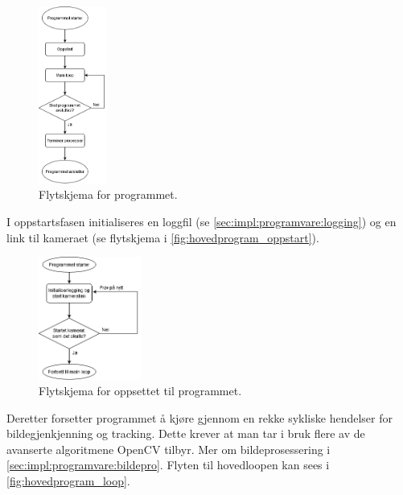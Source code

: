 \begin{figure}[H]
    \centering
    \includegraphics[width=0.2\textwidth]{implementering/Program/hovedprogram.png}
    \caption{Flytskjema for programmet.}
    \label{fig:hovedprogram}
\end{figure}

I oppstartsfasen initialiseres en loggfil (se \autoref{sec:impl:programvare:logging}) og en link til kameraet (se flytskjema i \autoref{fig:hovedprogram_oppstart}).

\begin{figure}[H]
    \centering
    \includegraphics[width=0.3\textwidth]{implementering/Program/oppstart.png}
    \caption{Flytskjema for oppsettet til programmet.}
    \label{fig:hovedprogram_oppstart}
\end{figure}

Deretter forsetter programmet å kjøre gjennom en rekke sykliske hendelser for bildegjenkjenning og tracking. 
Dette krever at man tar i bruk flere av de avanserte algoritmene OpenCV tilbyr. 
Mer om bildeprosessering i \autoref{sec:impl:programvare:bildepro}. 
Flyten til hovedloopen kan sees i \autoref{fig:hovedprogram_loop}.

